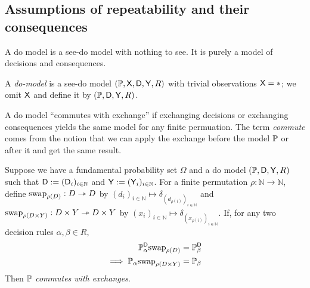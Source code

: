 





\subsection{Assumptions of repeatability and their consequences}

A do model is a see-do model with nothing to see. It is purely a model of decisions and consequences.

\begin{definition}[Do model]\label{def:domodel}
A \emph{do-model} is a see-do model $(\mathbb{P},\mathsf{X},\mathsf{D},\mathsf{Y},R)$ with trivial observations $\mathsf{X}=*$; we omit $\mathsf{X}$ and define it by $(\mathbb{P},\mathsf{D},\mathsf{Y},R)$.
\end{definition}

A do model ``commutes with exchange'' if exchanging decisions or exchanging consequences yields the same model for any finite permuation. The term \emph{commute} comes from the notion that we can apply the exchange before the model $\mathbb{P}$ or after it and get the same result.

\begin{definition}\label{def:caus_exch}
Suppose we have a fundamental probability set $\Omega$ and a do model $(\mathbb{P},\mathsf{D},\mathsf{Y},R)$ such that $\mathsf{D}:=(\mathsf{D}_i)_{i\in \mathbb{N}}$ and $\mathsf{Y}:=(\mathsf{Y}_i)_{i\in\mathbb{N}}$. For a finite permutation $\rho:\mathbb{N}\to\mathbb{N}$, define $\text{swap}_{\rho(D)}:D\rightarrowtriangle D$ by $(d_i)_{i\in\mathbb{N}}\mapsto \delta_{(d_{\rho(i)})_{i\in\mathbb{N}}}$ and $\text{swap}_{\rho(D\times Y)}:D\times Y\rightarrowtriangle D\times Y$ by $(x_i)_{i\in\mathbb{N}}\mapsto \delta_{(x_{\rho(i)})_{i\in\mathbb{N}}}$. If, for any two decision rules $\alpha,\beta \in R$,
\begin{align}
    \mathbb{P}_\alpha^{\mathsf{D}}\text{swap}_{\rho(D)} &= \mathbb{P}_{\beta}^{\mathsf{D}}\\
    \implies  \mathbb{P}_\alpha\text{swap}_{\rho(D\times Y)}&=\mathbb{P}_\beta
\end{align}
Then $\mathbb{P}$ \emph{commutes with exchanges}.
\end{definition}

